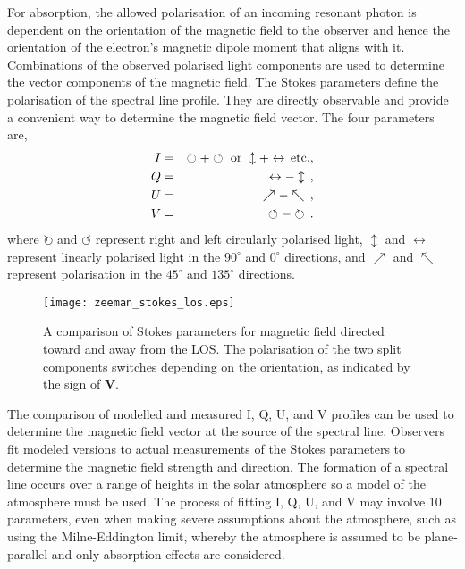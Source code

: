 For absorption, the allowed polarisation of an incoming resonant photon is dependent on the orientation of the magnetic field to the observer and hence the orientation of the electron's magnetic dipole moment that aligns with it. Combinations of the observed polarised light components are used to determine the vector components of the magnetic field. The Stokes parameters \citep{Stokes:1851} define the polarisation of the spectral line profile. They are directly observable and provide a convenient way to determine the magnetic field vector. The four parameters are,
\begin{eqnarray}
I &=& \circlearrowright+\circlearrowleft \mbox{ or } \updownarrow+\leftrightarrow \mbox{\,etc.,} \\
Q &=& \leftrightarrow - \updownarrow \mbox{\,,} \\
U &=& \nearrow - \nwarrow \mbox{\,,} \\
V &=& \circlearrowleft - \circlearrowright \mbox{\,.}
\end{eqnarray}
where $\circlearrowright$ and $\circlearrowleft$ represent right and left circularly polarised light, $\updownarrow$ and $\leftrightarrow$ represent linearly polarised light in the $90^\circ$ and $0^\circ$ directions, and $\nearrow$ and $\nwarrow$ represent polarisation in the $45^\circ$ and $135^\circ$ directions. 

\begin{figure}[!t]
\centerline{\texttt{[image: zeeman\_stokes\_los.eps]}}
\caption[A comparison of Stokes parameters for different magnetic fields.]{A comparison of Stokes parameters for magnetic field directed toward and away from the LOS. The polarisation of the two split components switches depending on the orientation, as indicated by the sign of $\mathbf{V}$.}
\label{fig:zeemanstokes}
\end{figure}

The comparison of modelled and measured I, Q, U, and V profiles can be used to determine the magnetic field vector at the source of the spectral line. Observers fit modeled versions to actual measurements of the Stokes parameters to determine the magnetic field strength and direction. The formation of a spectral line occurs over a range of heights in the solar atmosphere so a model of the atmosphere must be used. The process of fitting I, Q, U, and V may involve 10 parameters, even when making severe assumptions about the atmosphere, such as using the Milne-Eddington limit, whereby the atmosphere is assumed to be plane-parallel and only absorption effects are considered. 

